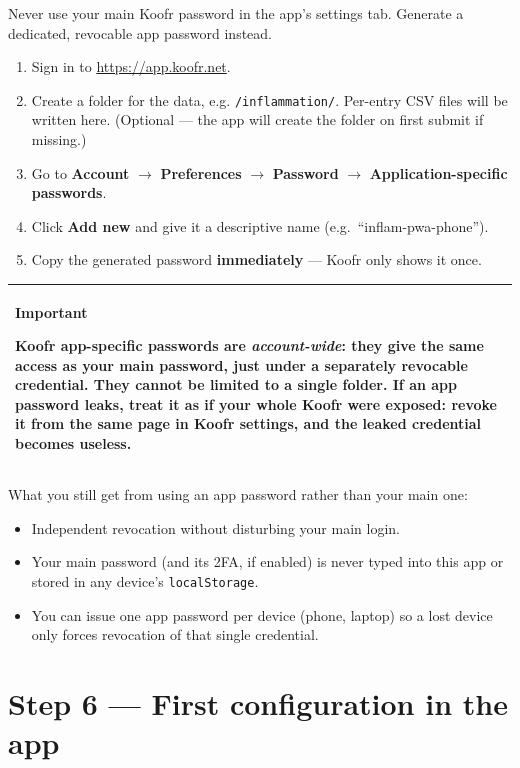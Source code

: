 \documentclass[11pt,a4paper]{article}
\newcommand{\callout}[3]{%
  \begin{center}%
  \begin{tabularx}{\linewidth}{|>{\columncolor{#1}}X|}%
  \hline
  \textbf{#2}\par\smallskip #3\\[2pt]
  \hline
  \end{tabularx}%
  \end{center}%
}
\newcommand{\warnbox}[1]{\callout{warnbg}{Important}{#1}}
\begin{document}
Never use your main Koofr password in the app's settings tab. Generate a dedicated, revocable app password instead.

\begin{enumerate}[leftmargin=*]
  \item Sign in to \url{https://app.koofr.net}.
  \item Create a folder for the data, e.g. \texttt{/inflammation/}. Per-entry CSV files will be written here. (Optional --- the app will create the folder on first submit if missing.)
  \item Go to \textbf{Account} $\rightarrow$ \textbf{Preferences} $\rightarrow$ \textbf{Password} $\rightarrow$ \textbf{Application-specific passwords}.
  \item Click \textbf{Add new} and give it a descriptive name (e.g.\ ``inflam-pwa-phone'').
  \item Copy the generated password \textbf{immediately} --- Koofr only shows it once.
\end{enumerate}

\warnbox{Koofr app-specific passwords are \emph{account-wide}: they give the same access as your main password, just under a separately revocable credential. They cannot be limited to a single folder. If an app password leaks, treat it as if your whole Koofr were exposed: revoke it from the same page in Koofr settings, and the leaked credential becomes useless.}

What you still get from using an app password rather than your main one:
\begin{itemize}[leftmargin=*,nosep]
  \item Independent revocation without disturbing your main login.
  \item Your main password (and its 2FA, if enabled) is never typed into this app or stored in any device's \texttt{localStorage}.
  \item You can issue one app password per device (phone, laptop) so a lost device only forces revocation of that single credential.
\end{itemize}

\section{Step 6 --- First configuration in the app}
\end{document}
